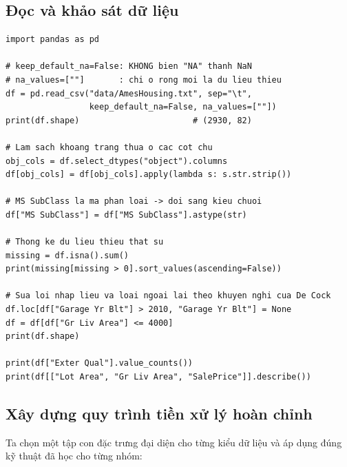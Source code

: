 \subsection{Đọc và khảo sát dữ liệu}

\begin{lstlisting}[caption={Đọc Ames Housing và giữ nguyên ý nghĩa của ``NA''}]
import pandas as pd

# keep_default_na=False: KHONG bien "NA" thanh NaN
# na_values=[""]       : chi o rong moi la du lieu thieu
df = pd.read_csv("data/AmesHousing.txt", sep="\t",
                 keep_default_na=False, na_values=[""])
print(df.shape)                       # (2930, 82)

# Lam sach khoang trang thua o cac cot chu
obj_cols = df.select_dtypes("object").columns
df[obj_cols] = df[obj_cols].apply(lambda s: s.str.strip())

# MS SubClass la ma phan loai -> doi sang kieu chuoi
df["MS SubClass"] = df["MS SubClass"].astype(str)

# Thong ke du lieu thieu that su
missing = df.isna().sum()
print(missing[missing > 0].sort_values(ascending=False))

# Sua loi nhap lieu va loai ngoai lai theo khuyen nghi cua De Cock
df.loc[df["Garage Yr Blt"] > 2010, "Garage Yr Blt"] = None
df = df[df["Gr Liv Area"] <= 4000]
print(df.shape)

print(df["Exter Qual"].value_counts())
print(df[["Lot Area", "Gr Liv Area", "SalePrice"]].describe())
\end{lstlisting}


\subsection{Xây dựng quy trình tiền xử lý hoàn chỉnh}

Ta chọn một tập con đặc trưng đại diện cho từng kiểu dữ liệu và áp dụng đúng kỹ thuật đã học cho từng nhóm:

